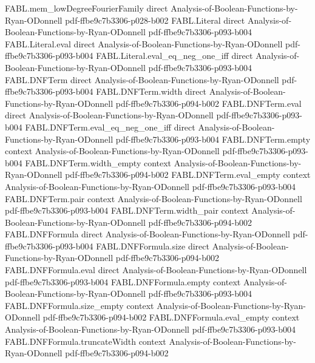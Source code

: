 \begin{theorem}
\proofstep
  {FABL.mem_lowDegreeFourierFamily}
  {direct}
  {Analysis-of-Boolean-Functions-by-Ryan-ODonnell}
  {pdf-ffbe9c7b3306-p028-b002}
\proofstep
  {FABL.Literal}
  {direct}
  {Analysis-of-Boolean-Functions-by-Ryan-ODonnell}
  {pdf-ffbe9c7b3306-p093-b004}
\proofstep
  {FABL.Literal.eval}
  {direct}
  {Analysis-of-Boolean-Functions-by-Ryan-ODonnell}
  {pdf-ffbe9c7b3306-p093-b004}
\proofstep
  {FABL.Literal.eval_eq_neg_one_iff}
  {direct}
  {Analysis-of-Boolean-Functions-by-Ryan-ODonnell}
  {pdf-ffbe9c7b3306-p093-b004}
\proofstep
  {FABL.DNFTerm}
  {direct}
  {Analysis-of-Boolean-Functions-by-Ryan-ODonnell}
  {pdf-ffbe9c7b3306-p093-b004}
\proofstep
  {FABL.DNFTerm.width}
  {direct}
  {Analysis-of-Boolean-Functions-by-Ryan-ODonnell}
  {pdf-ffbe9c7b3306-p094-b002}
\proofstep
  {FABL.DNFTerm.eval}
  {direct}
  {Analysis-of-Boolean-Functions-by-Ryan-ODonnell}
  {pdf-ffbe9c7b3306-p093-b004}
\proofstep
  {FABL.DNFTerm.eval_eq_neg_one_iff}
  {direct}
  {Analysis-of-Boolean-Functions-by-Ryan-ODonnell}
  {pdf-ffbe9c7b3306-p093-b004}
\proofstep
  {FABL.DNFTerm.empty}
  {context}
  {Analysis-of-Boolean-Functions-by-Ryan-ODonnell}
  {pdf-ffbe9c7b3306-p093-b004}
\proofstep
  {FABL.DNFTerm.width_empty}
  {context}
  {Analysis-of-Boolean-Functions-by-Ryan-ODonnell}
  {pdf-ffbe9c7b3306-p094-b002}
\proofstep
  {FABL.DNFTerm.eval_empty}
  {context}
  {Analysis-of-Boolean-Functions-by-Ryan-ODonnell}
  {pdf-ffbe9c7b3306-p093-b004}
\proofstep
  {FABL.DNFTerm.pair}
  {context}
  {Analysis-of-Boolean-Functions-by-Ryan-ODonnell}
  {pdf-ffbe9c7b3306-p093-b004}
\proofstep
  {FABL.DNFTerm.width_pair}
  {context}
  {Analysis-of-Boolean-Functions-by-Ryan-ODonnell}
  {pdf-ffbe9c7b3306-p094-b002}
\proofstep
  {FABL.DNFFormula}
  {direct}
  {Analysis-of-Boolean-Functions-by-Ryan-ODonnell}
  {pdf-ffbe9c7b3306-p093-b004}
\proofstep
  {FABL.DNFFormula.size}
  {direct}
  {Analysis-of-Boolean-Functions-by-Ryan-ODonnell}
  {pdf-ffbe9c7b3306-p094-b002}
\proofstep
  {FABL.DNFFormula.eval}
  {direct}
  {Analysis-of-Boolean-Functions-by-Ryan-ODonnell}
  {pdf-ffbe9c7b3306-p093-b004}
\proofstep
  {FABL.DNFFormula.empty}
  {context}
  {Analysis-of-Boolean-Functions-by-Ryan-ODonnell}
  {pdf-ffbe9c7b3306-p093-b004}
\proofstep
  {FABL.DNFFormula.size_empty}
  {context}
  {Analysis-of-Boolean-Functions-by-Ryan-ODonnell}
  {pdf-ffbe9c7b3306-p094-b002}
\proofstep
  {FABL.DNFFormula.eval_empty}
  {context}
  {Analysis-of-Boolean-Functions-by-Ryan-ODonnell}
  {pdf-ffbe9c7b3306-p093-b004}
\proofstep
  {FABL.DNFFormula.truncateWidth}
  {context}
  {Analysis-of-Boolean-Functions-by-Ryan-ODonnell}
  {pdf-ffbe9c7b3306-p094-b002}

\end{theorem}
